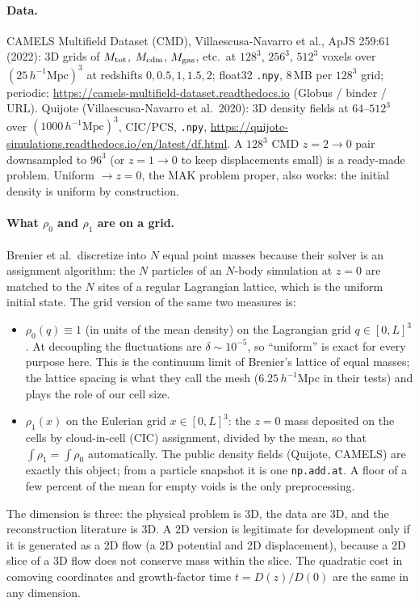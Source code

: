 \documentclass[11pt]{article}
\newcommand{\code}[1]{\texttt{#1}}
\begin{document}
\paragraph{Data.} CAMELS Multifield Dataset (CMD), Villaescusa-Navarro et al., ApJS
259:61 (2022): 3D grids of $M_{\rm tot}$, $M_{\rm cdm}$, $M_{\rm gas}$, etc.\ at
$128^3$, $256^3$, $512^3$ voxels over $(25\,h^{-1}\mathrm{Mpc})^3$ at redshifts
$0, 0.5, 1, 1.5, 2$; float32 \code{.npy}, 8\,MB per $128^3$ grid; periodic;
\url{https://camels-multifield-dataset.readthedocs.io} (Globus / binder / URL).
Quijote (Villaescusa-Navarro et al.\ 2020): 3D density fields at $64$--$512^3$ over
$(1000\,h^{-1}\mathrm{Mpc})^3$, CIC/PCS, \code{.npy},
\url{https://quijote-simulations.readthedocs.io/en/latest/df.html}. A $128^3$ CMD
$z=2\to0$ pair downsampled to $96^3$ (or $z=1\to0$ to keep displacements small) is a
ready-made problem. Uniform $\to z=0$, the MAK problem proper, also works: the
initial density is uniform by construction.

\paragraph{What $\rho_0$ and $\rho_1$ are on a grid.}
Brenier et al.\ discretize into $N$ equal point masses because their solver is an
assignment algorithm: the $N$ particles of an $N$-body simulation at $z=0$ are
matched to the $N$ sites of a regular Lagrangian lattice, which is the uniform
initial state. The grid version of the same two measures is:
\begin{itemize}
  \item $\rho_0(q)\equiv1$ (in units of the mean density) on the Lagrangian grid
        $q\in[0,L]^3$. At decoupling the fluctuations are $\delta\sim10^{-5}$, so
        ``uniform'' is exact for every purpose here. This is the continuum limit of
        Brenier's lattice of equal masses; the lattice spacing is what they call the
        mesh ($6.25\,h^{-1}$Mpc in their tests) and plays the role of our cell size.
  \item $\rho_1(x)$ on the Eulerian grid $x\in[0,L]^3$: the $z=0$ mass deposited on
        the cells by cloud-in-cell (CIC) assignment, divided by the mean, so that
        $\int\rho_1=\int\rho_0$ automatically. The public density fields (Quijote,
        CAMELS) are exactly this object; from a particle snapshot it is one
        \code{np.add.at}. A floor of a few percent of the mean for empty voids is the
        only preprocessing.
\end{itemize}
The dimension is three: the physical problem is 3D, the data are 3D, and the
reconstruction literature is 3D. A 2D version is legitimate for development only
if it is generated as a 2D flow (a 2D potential and 2D displacement), because a 2D
slice of a 3D flow does not conserve mass within the slice. The quadratic cost in
comoving coordinates and growth-factor time $t=D(z)/D(0)$ are the same in any
dimension.
\end{document}
